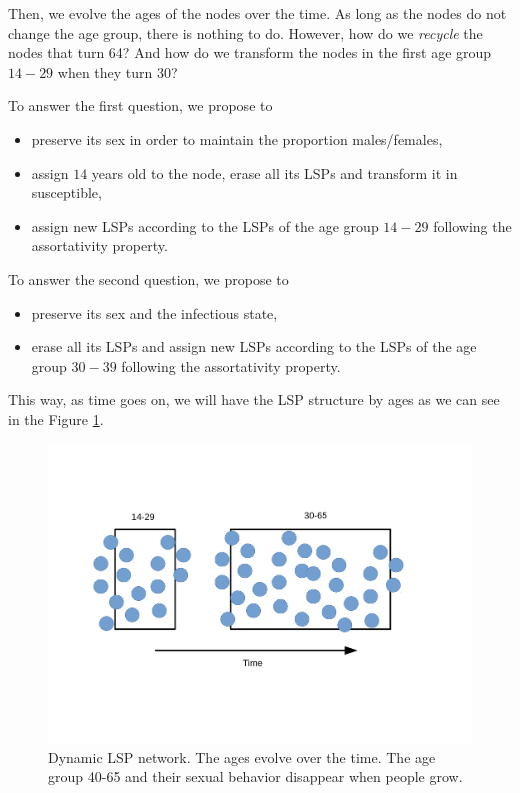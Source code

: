 Then, we evolve the ages of the nodes over the time. As long as the nodes do not change the age group, there is nothing to do. However, how do we \textit{recycle} the nodes that turn 64? And how do we transform the nodes in the first age group $14-29$ when they turn 30?  

To answer the first question, we propose to

\begin{itemize}
	\item preserve its sex in order to maintain the proportion males/females, 
	\item assign $14$ years old to the node, erase all its LSPs and transform it in susceptible,
	\item assign new LSPs according to the LSPs of the age group $14-29$ following the assortativity property.
\end{itemize}

To answer the second question, we propose to

\begin{itemize}
	\item preserve its sex and the infectious state, 
	\item erase all its LSPs and assign new LSPs according to the LSPs of the age group $30-39$ following the assortativity property.
\end{itemize}

This way, as time goes on, we will have the LSP structure by ages as we can see in the Figure \ref{fig:dinam2}.

\begin{figure}[h!]
	\centering
	\includegraphics[width=0.7\linewidth]{IMGs/2.-New_features/Dinam_2.pdf}
	\caption{Dynamic LSP network. The ages evolve over the time. The age group 40-65 and their sexual behavior disappear when people grow.}
	\label{fig:dinam2}
\end{figure}

